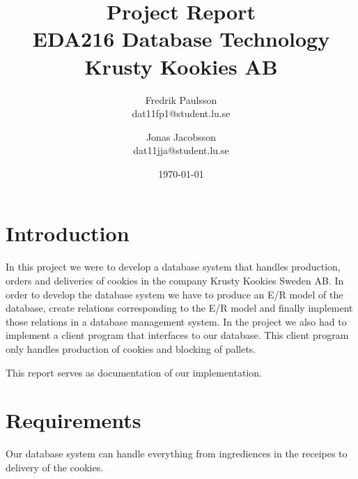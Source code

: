 \documentclass[a4paper]{article}
\title{Project Report \\ EDA216 Database Technology \\ Krusty Kookies AB}
\date{\today}
\author{Fredrik Paulsson \\ dat11fp1@student.lu.se \and Jonas Jacobsson \\ dat11jja@student.lu.se}
\begin{document}
\maketitle
\newpage


\section{Introduction}
In this project we were to develop a database system that handles production, orders and deliveries of cookies in the company Krusty Kookies Sweden AB. In order to develop the database system we have to produce an E/R model of the database, create relations corresponding to the E/R model and finally implement those relations in a database management system. In the project we also had to implement a client program that interfaces to our database. This client program only handles production of cookies and blocking of pallets.

This report serves as documentation of our implementation. 

\section{Requirements}
Our database system can handle everything from ingrediences in the receipes to delivery of the cookies. 
\end{document}
